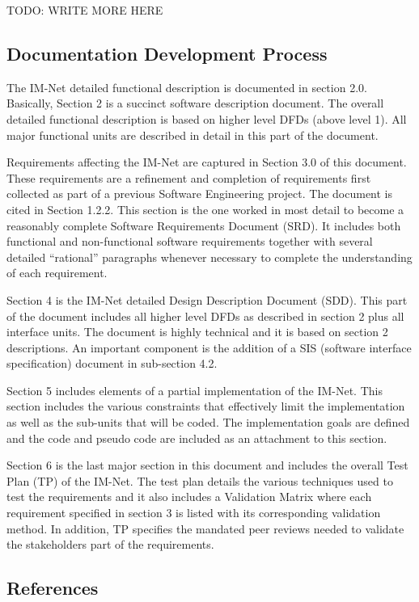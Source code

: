 \documentclass[letterpaper]{article}
\begin{document}
TODO: WRITE MORE HERE

\subsection{Documentation Development Process}

The IM-Net detailed functional description is documented in section 2.0. Basically, Section 2 is a succinct software description document. The overall detailed functional description is based on higher level DFDs (above level 1). All major functional units are described in detail in this part of the document.

Requirements affecting the IM-Net are captured in Section 3.0 of this document.  These requirements are a refinement and completion of requirements first collected as part of a previous Software Engineering project. The document is cited in Section 1.2.2. This section is the one worked in most detail to become a reasonably complete Software Requirements Document (SRD). It includes both functional and non-functional software requirements together with several detailed ``rational'' paragraphs whenever necessary to complete the understanding of each requirement.

Section 4 is the IM-Net detailed Design Description Document (SDD). This part of the document includes all higher level DFDs as described in section 2 plus all interface units. The document is highly technical and it is based on section 2 descriptions. An important component is the addition of a SIS (software interface specification) document in sub-section 4.2.

Section 5 includes elements of a partial implementation of the IM-Net. This section includes the various constraints that effectively limit the implementation as well as the sub-units that will be coded. The implementation goals are defined and the code and pseudo code are included as an attachment to this section.  

Section 6 is the last major section in this document and includes the overall Test Plan (TP) of the IM-Net. The test plan details the various techniques used to test the requirements and it also includes a Validation Matrix where each requirement specified in section 3 is listed with its corresponding validation method. In addition, TP specifies the mandated peer reviews needed to validate the stakeholders part of the requirements.

 
\subsection{References}
\end{document}
